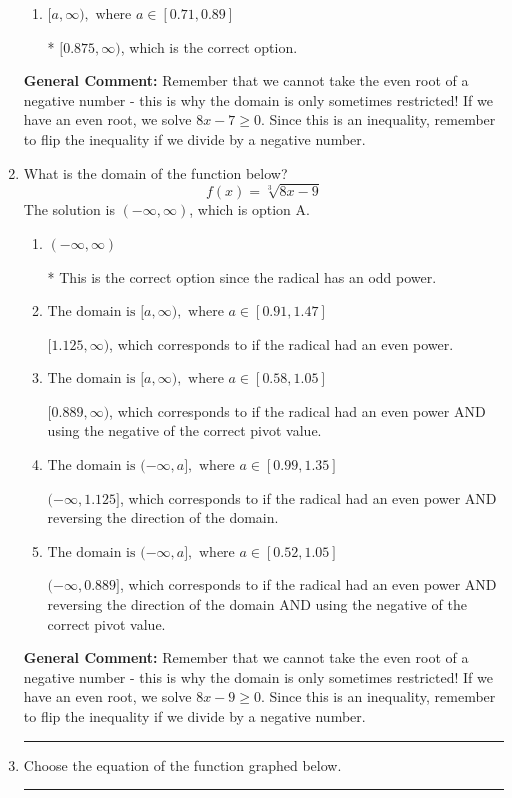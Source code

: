 \documentclass{extbook}[14pt]
\newcommand{\litem}[1]{\item #1

\rule{\textwidth}{0.4pt}}
\begin{document}
\begin{enumerate}
{\begin{enumerate}[label=\Alph*.]
$[1.143, \infty)$, which corresponds to using the negative of the correct pivot value.
\item \( [a, \infty), \text{ where } a \in [0.71, 0.89] \)

* $[0.875, \infty)$, which is the correct option.
\end{enumerate}

\textbf{General Comment:} Remember that we cannot take the even root of a negative number - this is why the domain is only sometimes restricted! If we have an even root, we solve $8 x - 7 \geq 0$. Since this is an inequality, remember to flip the inequality if we divide by a negative number.
}
\litem{
What is the domain of the function below?
\[ f(x) = \sqrt[3]{8 x - 9} \]The solution is \( (-\infty, \infty) \), which is option A.\begin{enumerate}[label=\Alph*.]
\item \( (-\infty, \infty) \)

* This is the correct option since the radical has an odd power.
\item \( \text{The domain is } [a, \infty), \text{   where } a \in [0.91, 1.47] \)

$[1.125, \infty)$, which corresponds to if the radical had an even power.
\item \( \text{The domain is } [a, \infty), \text{   where } a \in [0.58, 1.05] \)

$[0.889, \infty)$, which corresponds to if the radical had an even power AND using the negative of the correct pivot value.
\item \( \text{The domain is } (-\infty, a], \text{   where } a \in [0.99, 1.35] \)

$(-\infty, 1.125]$, which corresponds to if the radical had an even power AND reversing the direction of the domain.
\item \( \text{The domain is } (-\infty, a], \text{   where } a \in [0.52, 1.05] \)

$(-\infty, 0.889]$, which corresponds to if the radical had an even power AND reversing the direction of the domain AND using the negative of the correct pivot value.
\end{enumerate}

\textbf{General Comment:} Remember that we cannot take the even root of a negative number - this is why the domain is only sometimes restricted! If we have an even root, we solve $8 x - 9 \geq 0$. Since this is an inequality, remember to flip the inequality if we divide by a negative number.
}
\litem{
Choose the equation of the function graphed below.

}
\end{enumerate}
\end{document}
